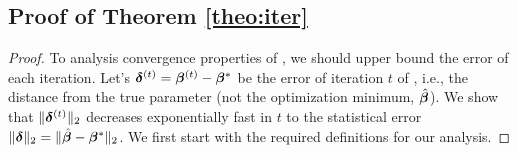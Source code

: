 \subsection{Proof of Theorem \ref{theo:iter}}
\begin{proof}
	To analysis convergence properties of \dc, we should upper bound the error of each iteration.%
	Let's $\boldsymbol{\delta}^{(t)} = \boldsymbol{\beta}^{(t)} - \boldsymbol{\beta}^*$ be the error of  iteration $t$ of \dc, i.e., the distance from the true parameter (not the optimization minimum, $\hat{\boldsymbol{\beta}}$).
	We show that $\|\boldsymbol{\delta}^{(t)}\|_{2}$ decreases exponentially fast in $t$ to the statistical error $\|\boldsymbol{\delta}\|_{2} = \|\hat{\boldsymbol{\beta}} - \boldsymbol{\beta}^*\|_{2}$.
	We first start with the required definitions for our analysis.
	

\end{proof}
